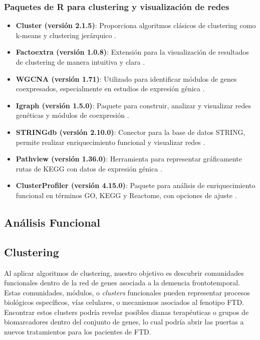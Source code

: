 \vspace{1cm}

\subsubsection*{Paquetes de R para clustering y visualización de redes}

\begin{itemize}
	\item \textbf{Cluster (versión 2.1.5)}: Proporciona algoritmos clásicos de clustering como k-means y clustering jerárquico \cite{cluster}.
	\item \textbf{Factoextra (versión 1.0.8)}: Extensión para la visualización de resultados de clustering de manera intuitiva y clara \cite{factoextra}.
	\item \textbf{WGCNA (versión 1.71)}: Utilizado para identificar módulos de genes coexpresados, especialmente en estudios de expresión génica \cite{wgcna}.
	\item \textbf{Igraph (versión 1.5.0)}: Paquete para construir, analizar y visualizar redes genéticas y módulos de coexpresión \cite{igraph}.
	\item \textbf{STRINGdb (versión 2.10.0)}: Conector para la base de datos STRING, permite realizar enriquecimiento funcional y visualizar redes \cite{stringdb}.
	\item \textbf{Pathview (versión 1.36.0)}: Herramienta para representar gráficamente rutas de KEGG con datos de expresión génica \cite{pathview}.
	\item \textbf{ClusterProfiler (versión 4.15.0)}: Paquete para análisis de enriquecimiento funcional en términos GO, KEGG y Reactome, con opciones de ajuste \cite{clusterprofiler}.
\end{itemize}

\subsection{Análisis Funcional}

\subsection{Clustering}

Al aplicar algoritmos de clustering, nuestro objetivo es descubrir comunidades funcionales dentro de la red de genes asociada a la demencia frontotemporal. Estas comunidades, módulos, o \textit{clusters} funcionales pueden representar procesos biológicos específicos, vías celulares, o mecanismos asociados al fenotipo FTD. Encontrar estos clusters podría revelar posibles dianas terapéuticas o grupos de biomarcadores dentro del conjunto de genes, lo cual podría abrir las puertas a nuevos tratamientos para los pacientes de FTD.

